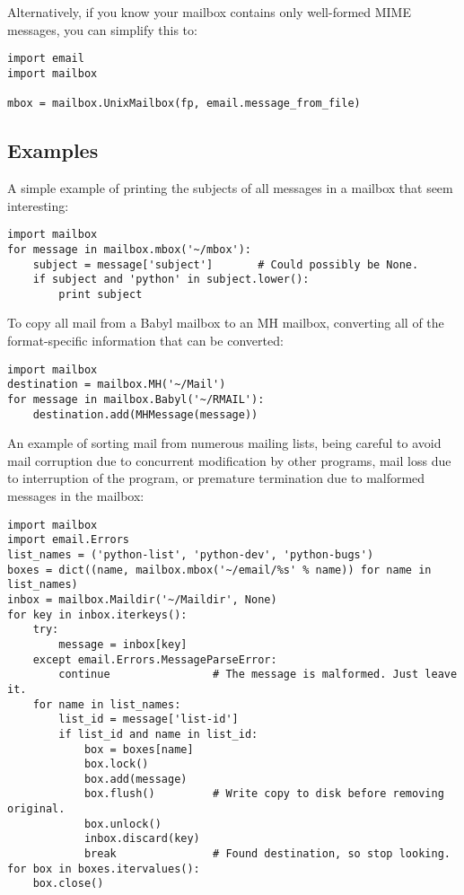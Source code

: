 Alternatively, if you know your mailbox contains only well-formed MIME
messages, you can simplify this to:

\begin{verbatim}
import email
import mailbox

mbox = mailbox.UnixMailbox(fp, email.message_from_file)
\end{verbatim}

\subsection{Examples}
\label{mailbox-examples}

A simple example of printing the subjects of all messages in a mailbox that
seem interesting:

\begin{verbatim}
import mailbox
for message in mailbox.mbox('~/mbox'):
    subject = message['subject']       # Could possibly be None.
    if subject and 'python' in subject.lower():
        print subject
\end{verbatim}

To copy all mail from a Babyl mailbox to an MH mailbox, converting all
of the format-specific information that can be converted:

\begin{verbatim}
import mailbox
destination = mailbox.MH('~/Mail')
for message in mailbox.Babyl('~/RMAIL'):
    destination.add(MHMessage(message))
\end{verbatim}

An example of sorting mail from numerous mailing lists, being careful to avoid
mail corruption due to concurrent modification by other programs, mail loss due
to interruption of the program, or premature termination due to malformed
messages in the mailbox:

\begin{verbatim}
import mailbox
import email.Errors
list_names = ('python-list', 'python-dev', 'python-bugs')
boxes = dict((name, mailbox.mbox('~/email/%s' % name)) for name in list_names)
inbox = mailbox.Maildir('~/Maildir', None)
for key in inbox.iterkeys():
    try:
        message = inbox[key]
    except email.Errors.MessageParseError:
        continue                # The message is malformed. Just leave it.
    for name in list_names:
        list_id = message['list-id']
        if list_id and name in list_id:
            box = boxes[name]
            box.lock()
            box.add(message)
            box.flush()         # Write copy to disk before removing original.
            box.unlock()
            inbox.discard(key)
            break               # Found destination, so stop looking.
for box in boxes.itervalues():
    box.close()
\end{verbatim}
